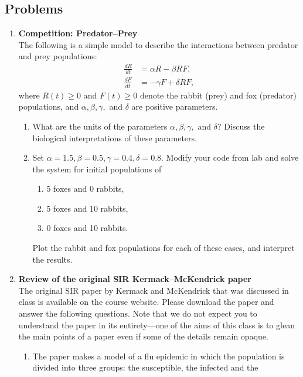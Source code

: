 \documentclass[12pt]{article}
\begin{document}
\subsection*{Problems}
\begin{enumerate}
\item \textbf{Competition: Predator--Prey}\\ The following is a simple model to
    describe the interactions between predator and prey populations:
    \begin{align*}
      \frac{d R}{d t} &= \alpha R - \beta R F, \\
      \frac{d F}{d t} &= - \gamma F + \delta R F, 
    \end{align*}
    where $R(t) \ge 0$ and $F(t) \ge 0$ denote the rabbit (prey) and fox
    (predator) populations, and $\alpha, \beta, \gamma,$ and $\delta$ are
    positive parameters.  
    \begin{enumerate}
      \item What are the units of the parameters $\alpha, \beta, \gamma,$ and
	$\delta$? Discuss the biological interpretations of these parameters.
      \item Set $\alpha = 1.5, \beta = 0.5, \gamma = 0.4, \delta = 0.8$. Modify
	your code from lab and solve the system for initial populations of
      \begin{enumerate}
	\item 5 foxes and 0 rabbits,
	\item 5 foxes and 10 rabbits,
	\item 0 foxes and 10 rabbits.
      \end{enumerate}
      Plot the rabbit and fox populations for each of these cases, and
      interpret the results.
    \end{enumerate}
    \item \textbf{Review of the original SIR Kermack--McKendrick paper}\\ The
    original SIR paper by Kermack and McKendrick that was discussed in class is
    available on the course website. Please download the paper and answer the
    following questions. Note that we do not expect you to understand the paper
    in its entirety---one of the aims of this class is to glean the main points
    of a paper even if some of the details remain opaque.
    \begin{enumerate}
      \item The paper makes a model of a flu epidemic in which the population
	is divided into three groups: the susceptible, the infected and the

\end{enumerate}
\end{enumerate}
\end{document}
